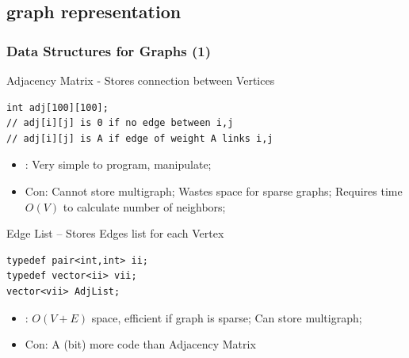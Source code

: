 \documentclass{beamer}
\begin{document}
\subsection{graph representation}
\begin{frame}[fragile]
  \frametitle{Data Structures for Graphs (1)}
{\smaller
  \begin{block}{Adjacency Matrix - Stores connection between Vertices}
\begin{verbatim}
int adj[100][100];
// adj[i][j] is 0 if no edge between i,j
// adj[i][j] is A if edge of weight A links i,j
\end{verbatim}

    \begin{itemize}
    \item {}: Very simple to program, manipulate;
    \item \alert{Con}: Cannot store multigraph; Wastes space for sparse
      graphs; Requires time $O(V)$ to calculate number of neighbors;
    \end{itemize}
  \end{block}

  \begin{block}{Edge List -- Stores Edges list for each Vertex}
\begin{verbatim}
typedef pair<int,int> ii;
typedef vector<ii> vii;
vector<vii> AdjList;
\end{verbatim}

    \begin{itemize}
    \item {}: $O(V+E)$ space, efficient if graph is sparse; Can store multigraph; 
    \item \alert{Con}: A (bit) more code than Adjacency Matrix
    \end{itemize}
  \end{block}

  }
\end{frame}
\end{document}

